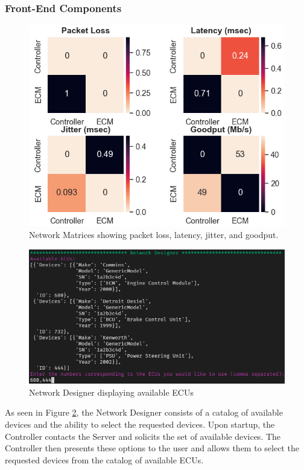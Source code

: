 \documentclass[letterpaper,twocolumn,12pt]{article}
\begin{document}
\subsubsection{Front-End Components}
\begin{figure}[]
    \centering
    \includegraphics[width=\linewidth]{images/network_matrix.png}
    \caption[]{Network Matrices showing packet loss, latency, jitter, and goodput.}
    \label{fig:network_matrix}
\end{figure}
\begin{figure}[]
    \centering
    \includegraphics[width=\linewidth]{images/network_designer.png}
    \caption[]{Network Designer displaying available ECUs\protect\footnotemark}
    \label{fig:network_designer}
\end{figure}

As seen in Figure \ref{fig:network_designer}, the Network Designer consists of a catalog of available devices and the ability to select the requested devices. Upon startup, the Controller contacts the Server and solicits the set of available devices. The Controller then presents these options to the user and allows them to select the requested devices from the catalog of available ECUs.
\end{document}
